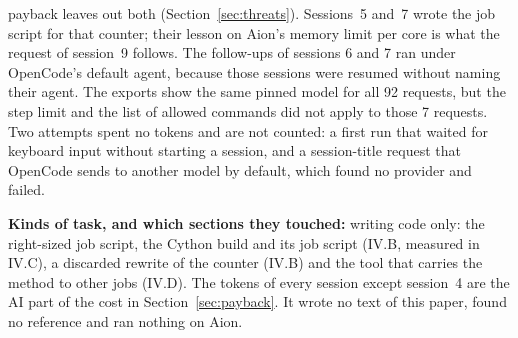 \documentclass[conference,a4paper]{IEEEtran}
\begin{document}
payback leaves out both (Section~\ref{sec:threats}). Sessions~5 and~7 wrote the
job script for that counter; their lesson on Aion's memory limit per core is
what the request of session~9 follows.
The follow-ups of sessions 6 and 7 ran under OpenCode's default agent, because
those sessions were resumed without naming their agent. The exports show the
same pinned model for all 92 requests, but the step limit and the list of
allowed commands did not apply to those 7 requests. Two attempts spent no
tokens and are not counted: a first run that waited for keyboard input without
starting a session, and a session-title request that OpenCode sends to another
model by default, which found no provider and failed.

\textbf{Kinds of task, and which sections they touched:} writing code only:
the right-sized job script, the Cython build and its job script (IV.B, measured
in IV.C), a discarded rewrite of the counter (IV.B) and the tool that carries
the method to other jobs (IV.D). The tokens of every session except
session~4 are the AI part of the cost in Section~\ref{sec:payback}. It wrote no text of this paper, found no
reference and ran nothing on Aion.
\end{document}

